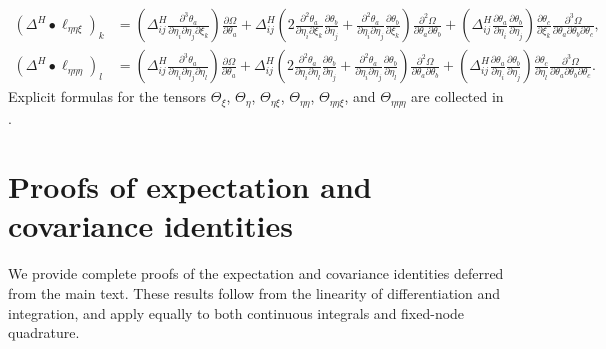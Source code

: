 \documentclass{article}
\begin{document}
%
\begin{align}
  (\Delta^H \bullet \ell_{\eta\eta\xi})_k  & = \left( \Delta^H_{ij} \tfrac{\partial^3 \theta_a}{\partial \eta_i \partial \eta_j \partial \xi_k} \right) \tfrac{\partial \Omega}{\partial \theta_a} + \Delta^H_{ij} \left( 2 \tfrac{\partial^2 \theta_a}{\partial \eta_i \partial \xi_k} \tfrac{\partial \theta_b}{\partial \eta_j} + \tfrac{\partial^2 \theta_a}{\partial \eta_i \partial \eta_j} \tfrac{\partial \theta_b}{\partial \xi_k} \right) \tfrac{\partial^2 \Omega}{\partial \theta_a \partial \theta_b} + \left( \Delta^H_{ij} \tfrac{\partial \theta_a}{\partial \eta_i} \tfrac{\partial \theta_b}{\partial \eta_j} \right) \tfrac{\partial \theta_c}{\partial \xi_k} \tfrac{\partial^3 \Omega}{\partial \theta_a \partial \theta_b \partial \theta_c}, \label{eq:third-derivative-ell-eta-eta-xi-delta-h}      \\
  (\Delta^H \bullet \ell_{\eta\eta\eta})_l & = \left( \Delta^H_{ij} \tfrac{\partial^3 \theta_a}{\partial \eta_i \partial \eta_j \partial \eta_l} \right) \tfrac{\partial \Omega}{\partial \theta_a} + \Delta^H_{ij} \left( 2 \tfrac{\partial^2 \theta_a}{\partial \eta_i \partial \eta_l} \tfrac{\partial \theta_b}{\partial \eta_j} + \tfrac{\partial^2 \theta_a}{\partial \eta_i \partial \eta_j} \tfrac{\partial \theta_b}{\partial \eta_l} \right) \tfrac{\partial^2 \Omega}{\partial \theta_a \partial \theta_b} + \left( \Delta^H_{ij} \tfrac{\partial \theta_a}{\partial \eta_i} \tfrac{\partial \theta_b}{\partial \eta_j} \right) \tfrac{\partial \theta_c}{\partial \eta_l} \tfrac{\partial^3 \Omega}{\partial \theta_a \partial \theta_b \partial \theta_c}. \label{eq:third-derivative-ell-eta-eta-eta-delta-h}
\end{align}
%
Explicit formulas for the tensors $\Theta_{\xi}$, $\Theta_{\eta}$, $\Theta_{\eta\xi}$, $\Theta_{\eta\eta}$, $\Theta_{\eta\eta\xi}$, and $\Theta_{\eta\eta\eta}$ are collected in .




\appendix

\section{Proofs of expectation and covariance identities}\label{app:proofs-expectation-covariance}

We provide complete proofs of the expectation and covariance identities deferred from the main text.
These results follow from the linearity of differentiation and integration, and apply equally to both continuous integrals and fixed-node quadrature.
\end{document}
